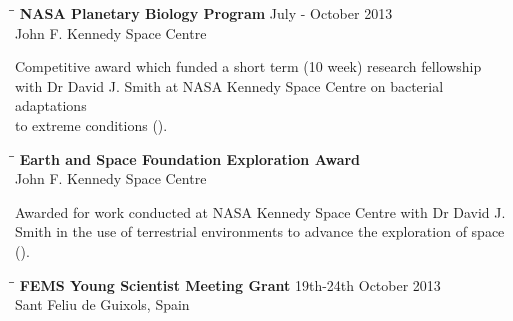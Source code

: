 \documentclass{res}
\begin{document}
\begin{resume}
  \begin{tabbing}
   \hspace{2in}\= \hspace{2.6in}\= \kill 
    {\bf NASA Planetary Biology Program} \> \>July - October 2013\\
                            \> 
                            \> John F. Kennedy Space Centre\\

   \end{tabbing}\vspace{-30pt}     
   Competitive award which funded a short term (10 week) research fellowship \\ with Dr David J. Smith at NASA Kennedy Space Centre on bacterial adaptations \\ to extreme conditions ().

   \vspace{-0.1in}  
 
   
   \begin{tabbing}
   \hspace{2in}\= \hspace{2.6in}\= \kill 
    {\bf Earth and Space Foundation Exploration Award} \> \\
                            \> 
                            \> John F. Kennedy Space Centre\\


   \end{tabbing}\vspace{-30pt}     
   Awarded for work conducted at NASA Kennedy Space Centre with Dr David J. \\ Smith in the use of terrestrial environments to advance the exploration of space ().

   \vspace{-0.1in}  
   
   \begin{tabbing}
   \hspace{2in}\= \hspace{2.6in}\= \kill 
    {\bf FEMS Young Scientist Meeting Grant} \> \> 19th-24th October 2013\\
                            \>  
                            \> Sant Feliu de Guixols, Spain \\
                       
   \end{tabbing}\vspace{-30pt}      


\end{resume}
\end{document}
